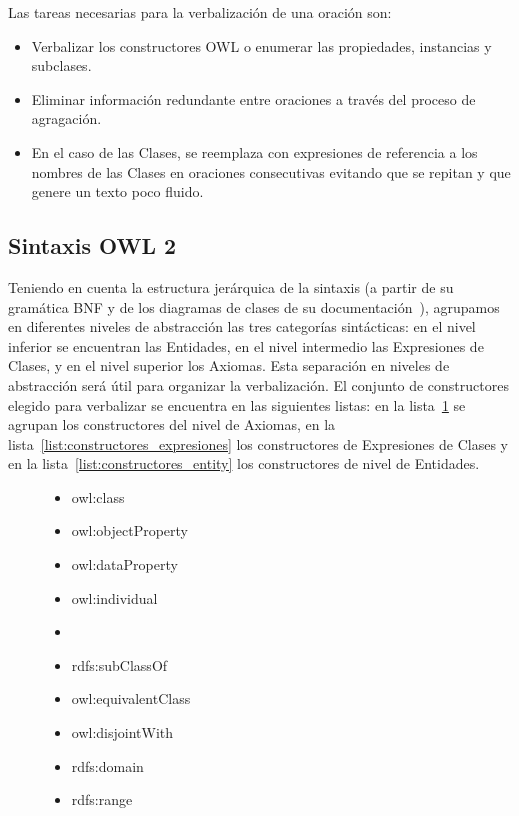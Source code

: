 Las tareas necesarias para la verbalización de una oración son:
\begin{itemize}
    \item Verbalizar los constructores OWL o enumerar las propiedades, instancias y subclases.
    \item Eliminar información redundante entre oraciones a través del proceso de agragación.
    \item En el caso de las Clases, se reemplaza con expresiones de referencia a los nombres de las Clases en oraciones consecutivas evitando que se repitan y que genere un texto poco fluido.
\end{itemize}

\subsection{Sintaxis OWL 2}
\label{sec:gen_doc_sintaxis_owl}
Teniendo en cuenta la estructura jerárquica de la sintaxis (a partir de su gramática BNF y de los diagramas de clases de su documentación~\cite{OWL2W3C}), agrupamos en diferentes niveles de abstracción las tres categorías sintácticas: en el nivel inferior se encuentran las Entidades, en el nivel intermedio las Expresiones de Clases, y en el nivel superior los Axiomas. Esta separación en niveles de abstracción será útil para organizar la verbalización. El conjunto de constructores elegido para verbalizar se encuentra en las siguientes listas: en la lista~\ref{list:constructores_axiomas} se agrupan los constructores del nivel de Axiomas, en la lista~\ref{list:constructores_expresiones} los constructores de Expresiones de Clases y en la lista~\ref{list:constructores_entity} los constructores de nivel de Entidades.
\begin{figure}
\begin{multicols}{2}
\label{list:constructores_entity}
    \begin{itemize}
        \item owl:class
        \item owl:objectProperty
        \item owl:dataProperty
        \item owl:individual
        \item[\vspace{\fill}]
    \end{itemize}

\label{list:constructores_axiomas}
    \begin{itemize}
        \item rdfs:subClassOf
        \item owl:equivalentClass
        \item owl:disjointWith
        \item rdfs:domain
        \item rdfs:range
    \end{itemize}
    \end{multicols}
\end{figure}


